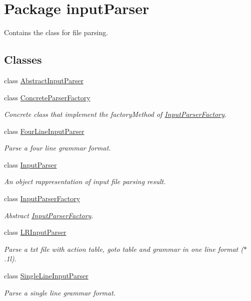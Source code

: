 \hypertarget{namespaceinput_parser}{\section{Package input\-Parser}
\label{namespaceinput_parser}
}


Contains the class for file parsing.  


\subsection*{Classes}
\begin{DoxyCompactItemize}
\item 
class \hyperlink{classinput_parser_1_1_abstract_input_parser}{Abstract\-Input\-Parser}
\item 
class \hyperlink{classinput_parser_1_1_concrete_parser_factory}{Concrete\-Parser\-Factory}
\begin{DoxyCompactList}\small\item\em Concrete class that implement the factory\-Method of \hyperlink{classinput_parser_1_1_input_parser_factory}{Input\-Parser\-Factory}. \end{DoxyCompactList}\item 
class \hyperlink{classinput_parser_1_1_four_line_input_parser}{Four\-Line\-Input\-Parser}
\begin{DoxyCompactList}\small\item\em Parse a four line grammar format. \end{DoxyCompactList}\item 
class \hyperlink{classinput_parser_1_1_input_parser}{Input\-Parser}
\begin{DoxyCompactList}\small\item\em An object rappresentation of input file parsing result. \end{DoxyCompactList}\item 
class \hyperlink{classinput_parser_1_1_input_parser_factory}{Input\-Parser\-Factory}
\begin{DoxyCompactList}\small\item\em Abstract \hyperlink{classinput_parser_1_1_input_parser_factory}{Input\-Parser\-Factory}. \end{DoxyCompactList}\item 
class \hyperlink{classinput_parser_1_1_l_r_input_parser}{L\-R\-Input\-Parser}
\begin{DoxyCompactList}\small\item\em Parse a txt file with action table, goto table and grammar in one line format ($\ast$.1l). \end{DoxyCompactList}\item 
class \hyperlink{classinput_parser_1_1_single_line_input_parser}{Single\-Line\-Input\-Parser}
\begin{DoxyCompactList}\small\item\em Parse a single line grammar format. \end{DoxyCompactList}\end{DoxyCompactItemize}


